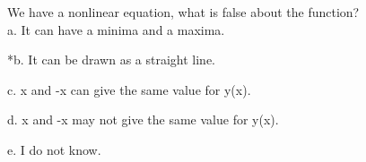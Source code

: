 
We have a nonlinear equation, what is false about the function?  \\

a. It can have a minima and a maxima.

*b. It can be drawn as a straight line.

c.  x and -x can give the same value for y(x).

d.  x and -x may not give the same value for y(x).

e. I do not know. \\ 
